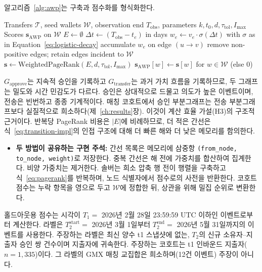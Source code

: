 알고리즘~\ref{alg:awp}는 구축과 점수화를 형식화한다.

\begin{algorithm}[htbp]
\caption{AWP graph construction and scoring}
\label{alg:awp}
\begin{algorithmic}[1]
\Require Transfers $\mathcal{T}$, seed wallets $\mathcal{W}$, observation end $T_{\mathrm{obs}}$, parameters $k,t_0,d,\tau_{\mathrm{tol}},I_{\max}$
\Ensure Scores $\mathbf{s}_{\mathrm{AWP}}$ on $\mathcal{W}$
\State $E \gets \emptyset$
  \State $\Delta t \gets (T_{\mathrm{obs}}-t_e)$ in days
  \State $w_e \gets v_e\cdot\sigma(\Delta t)$ with $\sigma$ as in Equation~\eqref{eq:logistic-decay}
  \State accumulate $w_e$ on edge $(u\to v)$
\EndFor
\State remove non-positive edges; retain edges incident to $\mathcal{W}$
\State $\mathbf{s} \gets \mathrm{WeightedPageRank}(E, d, \tau_{\mathrm{tol}}, I_{\max})$
\State \Return $\mathbf{s}_{\mathrm{AWP}}[w] \gets \mathbf{s}[w]$ for $w\in\mathcal{W}$ (else $0$)
\end{algorithmic}
\end{algorithm}

$G_{\mathrm{approve}}$는 지속적 승인을 기록하고 $G_{\mathrm{transfer}}$는 과거 가치 흐름을 기록하므로, 두 그래프는 밀도와 시간 민감도가 다르다. 승인은 상대적으로 드물고 의도가 높은 이벤트이며, 전송은 빈번하고 종종 기계적이다. 매칭 코호트에서 승인 부분그래프는 전송 부분그래프보다 실질적으로 희소하다(제~\ref{ch:results}장). 이것이 계산 효율 가설(H3)의 구조적 근거이다. 반복당 PageRank 비용은 $|E|$에 비례하므로, 더 적은 간선은 식~\eqref{eq:transition-impl}의 인접 구조에 대해 더 빠른 해와 더 낮은 메모리를 함의한다.

\begin{itemize}
\item \textbf{두 방법이 공유하는 구현 주석:} 간선 목록은 메모리에 삼중항 \texttt{(from\_node, to\_node, weight)}로 저장한다. 중복 간선은 해 전에 가중치를 합산하여 집계한다. 비양 가중치는 제거한다. 솔버는 희소 압축 행 전이 행렬을 구축하고 식~\eqref{eq:pagerank}를 반복하며, 노드 식별자에서 점수로의 사전을 반환한다. 코호트 점수는 누락 항목을 영으로 두고 $\mathcal{W}$에 정합한 뒤, 상관을 위해 밀집 순위로 변환한다.

\end{itemize}


홀드아웃용 점수는 시각이 $T_1=$ 2026년 2월 28일 23:59:59 UTC 이하인 이벤트로부터 계산한다. 라벨은 $T_2^{\mathrm{start}}=$ 2026년 3월 1일부터 $T_2^{\mathrm{end}}=$ 2026년 5월 31일까지의 이벤트를 사용한다. 주장하는 라벨은 최신 양수 t1 스냅샷에 없는, $T_2$의 신규 소유자--지출자 승인 쌍 건수이며 지출자에 귀속한다. 주장하는 코호트는 t1 인바운드 지출자($n=1{,}335$)이다. 그 라벨의 GMX 매칭 교집합은 희소하며(12건 이벤트) 주장이 아니다.

